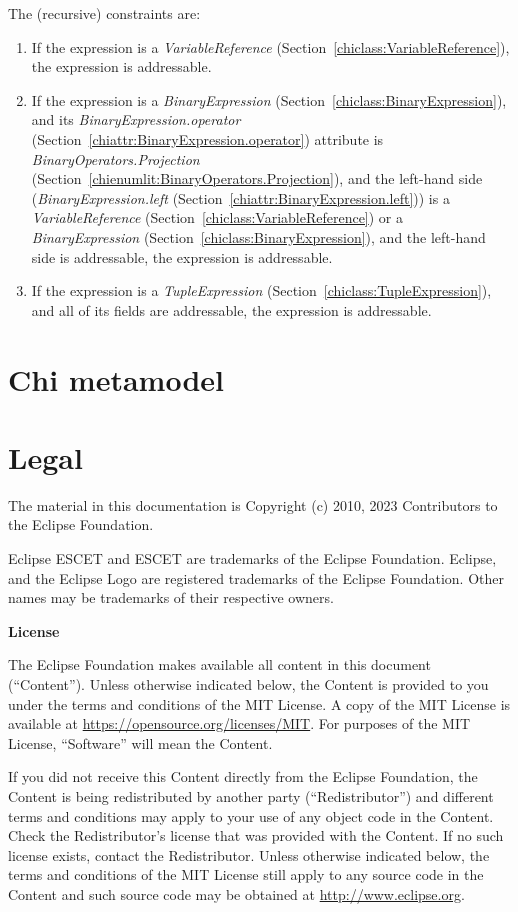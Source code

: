 \documentclass{report}
\newcommand{\chiclass}[1]{\textit{#1} (Section~\ref{chiclass:#1})}
\newcommand{\chiattr}[1]{\textit{#1} (Section~\ref{chiattr:#1})}
\newcommand{\chienumlit}[1]{\textit{#1} (Section~\ref{chienumlit:#1})}
\begin{document}
The (recursive) constraints are:
\begin{enumerate}
\item If the expression is a \chiclass{VariableReference}, the expression is
    addressable.
\item If the expression is a \chiclass{BinaryExpression}, and its
    \chiattr{BinaryExpression.operator} attribute is
    \chienumlit{BinaryOperators.Projection}, and the left-hand side
    (\chiattr{BinaryExpression.left}) is a \chiclass{VariableReference} or a
    \chiclass{BinaryExpression}, and the left-hand side is addressable,
    the expression is addressable.
\item If the expression is a \chiclass{TupleExpression}, and all of its
    fields are addressable, the expression is addressable.
\end{enumerate}


\chapter{Chi metamodel}





\chapter{Legal}

The material in this documentation is
Copyright (c) 2010, 2023 Contributors to the Eclipse Foundation.

Eclipse ESCET and ESCET are trademarks of the Eclipse Foundation.
Eclipse, and the Eclipse Logo are registered trademarks of the
Eclipse Foundation. Other names may be trademarks of their
respective owners.

\textbf{License}

The Eclipse Foundation makes available all content in this document
(``Content''). Unless otherwise indicated below, the Content is provided to you
under the terms and conditions of the MIT License. A copy of the MIT License
is available at \url{https://opensource.org/licenses/MIT}. For purposes of the
MIT License, ``Software'' will mean the Content.

If you did not receive this Content directly from the Eclipse Foundation,
the Content is being redistributed by another party (``Redistributor'') and
different terms and conditions may apply to your use of any object code in
the Content. Check the Redistributor's license that was provided with the
Content. If no such license exists, contact the Redistributor. Unless
otherwise indicated below, the terms and conditions of the MIT License
still apply to any source code in the Content and such source code may be
obtained at \url{http://www.eclipse.org}.





\end{document}
